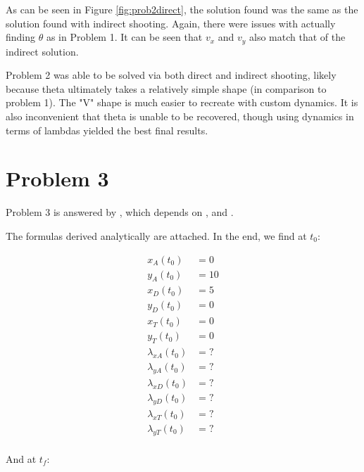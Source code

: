 \documentclass[12pt,letterpaper]{article}
\begin{document}
As can be seen in Figure \ref{fig:prob2direct}, the solution found was the same as the solution found with indirect shooting. Again, there were issues with actually finding $\theta$ as in Problem 1. It can be seen that $v_x$ and $v_y$ also match that of the indirect solution.


Problem 2 was able to be solved via both direct and indirect shooting, likely because theta ultimately takes a relatively simple shape (in comparison to problem 1). The "V" shape is much easier to recreate with custom dynamics. It is also inconvenient that theta is unable to be recovered, though using dynamics in terms of lambdas yielded the best final results.






\section*{Problem 3}

Problem 3 is answered by , which depends on , and .

The formulas derived analytically are attached. In the end, we find at $t_0$:

\begin{equation}
\begin{aligned}
\label{eq:2}
x_A(t_0) &= 0 \\
y_A(t_0) &= 10 \\
x_D(t_0) &= 5 \\
y_D(t_0) &= 0 \\
x_T(t_0) &= 0 \\
y_T(t_0) &= 0 \\
\lambda_{xA}(t_0) &= ? \\
\lambda_{yA}(t_0) &= ? \\
\lambda_{xD}(t_0) &= ? \\
\lambda_{yD}(t_0) &= ? \\
\lambda_{xT}(t_0) &= ? \\
\lambda_{yT}(t_0) &= ? \\
\end{aligned}
\end{equation}

And at $t_f$:
\end{document}
